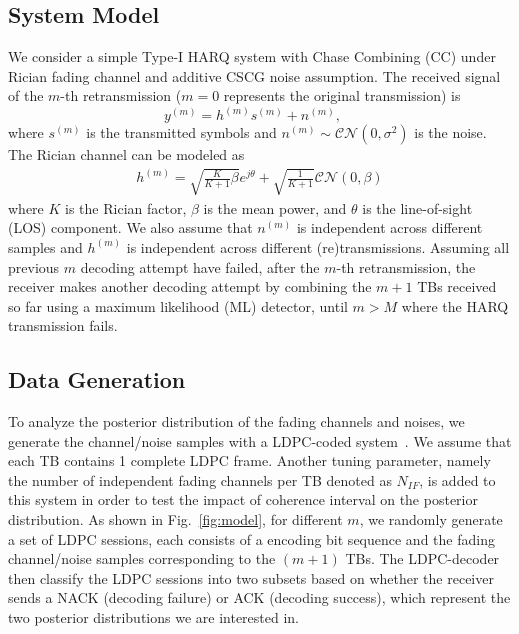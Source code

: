 \documentclass[journal,draftcls,onecolumn,12pt,twoside]{IEEEtran}
\begin{document}
\subsection{System Model}
\label{subsec:model}
We consider a simple Type-I HARQ system with Chase Combining (CC) under Rician
fading channel and additive CSCG noise assumption. The received signal of the
$m$-th retransmission ($m=0$ represents the original transmission) is
\begin{equation}
  y^{(m)} = h^{(m)}s^{(m)} + n^{(m)}, \quad
\end{equation}
where $s^{(m)}$ is the transmitted symbols and
$n^{(m)}\sim\mathcal{CN}(0,\sigma^2)$ is the noise. The Rician channel can be
modeled as~\cite{}
\begin{align}
    h^{(m)} = \sqrt{\frac{K}{K+1}\beta}e^{j\theta} +
    \sqrt{\frac{1}{K+1}}\mathcal{CN}(0,\beta)
\end{align}
where $K$ is the Rician factor, $\beta$ is the mean power, and $\theta$ is the
line-of-sight (LOS) component. We also assume that $n^{(m)}$ is independent
across different samples and $h^{(m)}$ is independent across different
(re)transmissions. Assuming all previous $m$ decoding attempt have failed,
after the $m$-th retransmission, the receiver makes another decoding attempt by
combining the $m + 1$ TBs received so far using a maximum likelihood (ML)
detector, until $m > M$ where the HARQ transmission fails.

\subsection{Data Generation}
To analyze the posterior distribution of the fading channels and
noises, we generate the channel/noise samples with a LDPC-coded
system~\cite{}. We assume that each TB contains 1 complete LDPC frame. Another
tuning parameter, namely the number of independent fading channels per TB denoted as $N_{IF}$, is added
to this system in order to test the impact of coherence interval on the
posterior distribution. As shown in Fig.~\ref{fig:model}, for different $m$, we
randomly generate a set of LDPC sessions, each consists of a encoding bit sequence and the
fading channel/noise samples corresponding to the $(m+1)$ TBs. The LDPC-decoder
then classify the LDPC sessions into two subsets based on whether the receiver
sends a NACK (decoding failure) or ACK (decoding success), which represent the
two posterior distributions we are interested in. 
\end{document}
